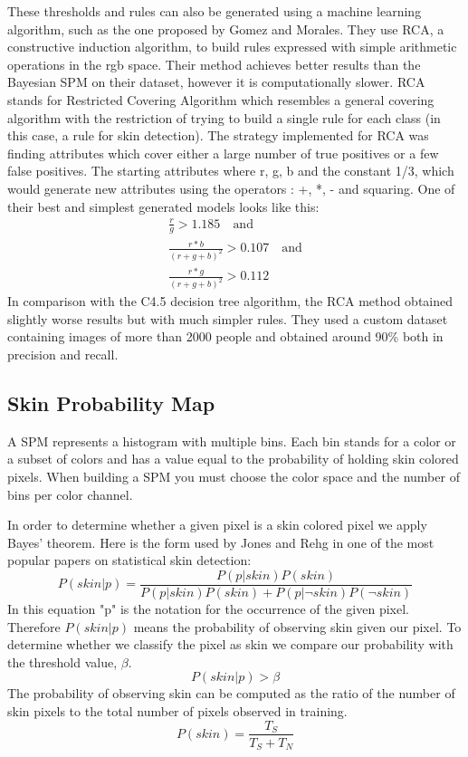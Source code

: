 \documentclass[12pt]{report}
\begin{document}
	These thresholds and rules can also be generated using a machine learning algorithm, such as the one proposed by Gomez and Morales\cite{rca_threshold}. They use RCA, a constructive induction algorithm, to build rules expressed with simple arithmetic operations in the rgb space. Their method achieves better results than the Bayesian SPM on their dataset, however it is computationally slower. RCA stands for Restricted Covering Algorithm which resembles a general covering algorithm with the restriction of trying to build a single rule for each class (in this case, a rule for skin detection). The strategy implemented for RCA was finding attributes which cover either a large number of true positives or a few false positives. The starting attributes where r, g, b and the constant 1/3, which would generate new attributes using the operators : +, *, - and squaring. One of their best and simplest generated models looks like this:
	\begin{equation}
	\begin{split}
	\frac{r}{g} > 1.185 \quad \textrm{and}\\
	\frac{r * b}{(r + g + b)^2} > 0.107 \quad \textrm{and}\\
	\frac{r * g}{(r + g + b)^2} > 0.112
	\end{split}
	\end{equation}
	In comparison with the C4.5 decision tree algorithm, the RCA method obtained slightly worse results but with much simpler rules. They used a custom dataset containing images of more than 2000 people and obtained around 90\% both in precision and recall.
	
	\subsection{Skin Probability Map}
	A SPM represents a histogram with multiple bins. Each bin stands for a color or a subset of colors and has a value equal to the probability of holding skin colored pixels. When building a SPM you must choose the color space and the number of bins per color channel.
	
	In order to determine whether a given pixel is a skin colored pixel we apply Bayes' theorem. Here is the form used by Jones and Rehg\cite{compaq} in one of the most popular papers on statistical skin detection:
	\begin{equation}
	P(skin|p) = \frac{P(p|skin)P(skin)}{P(p|skin)P(skin) + P(p|\neg skin)P(\neg skin)}
	\end{equation}
	In this equation "p" is the notation for the occurrence of the given pixel. Therefore $P(skin|p)$ means the probability of observing skin given our pixel. To determine whether we classify the pixel as skin we compare our probability with the threshold value, \( \beta \).
	\begin{equation}
	P(skin|p) > \beta
	\end{equation}
	The probability of observing skin can be computed as the ratio of the number of skin pixels to the total number of pixels observed in training.
	\begin{equation}
	P(skin) = \frac{T_S}{T_S + T_N}
	\end{equation}
\end{document}
